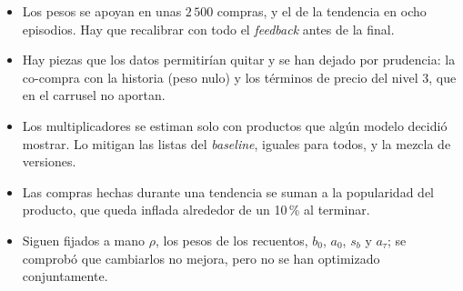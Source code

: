 \documentclass[11pt,a4paper]{article}
\begin{document}
\begin{itemize}
\item Los pesos se apoyan en unas $2\,500$ compras, y el de la tendencia en ocho episodios. Hay que
recalibrar con todo el \emph{feedback} antes de la final.
\item Hay piezas que los datos permitirían quitar y se han dejado por prudencia: la co-compra con la
historia (peso nulo) y los términos de precio del nivel 3, que en el carrusel no aportan.
\item Los multiplicadores se estiman solo con productos que algún modelo decidió mostrar. Lo mitigan las
listas del \emph{baseline}, iguales para todos, y la mezcla de versiones.
\item Las compras hechas durante una tendencia se suman a la popularidad del producto, que queda inflada
alrededor de un 10\,\% al terminar.
\item Siguen fijados a mano $\rho$, los pesos de los recuentos, $b_0$, $a_0$, $s_b$ y $a_\tau$; se
comprobó que cambiarlos no mejora, pero no se han optimizado conjuntamente.
\end{itemize}
\end{document}
